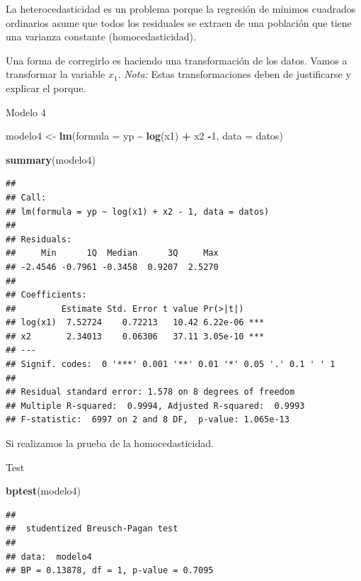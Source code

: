 \documentclass[
]{book}
\newenvironment{Shaded}{\begin{snugshade}}{\end{snugshade}}
\newcommand{\AttributeTok}[1]{\textcolor[rgb]{0.13,0.29,0.53}{#1}}
\newcommand{\DecValTok}[1]{\textcolor[rgb]{0.00,0.00,0.81}{#1}}
\newcommand{\FunctionTok}[1]{\textcolor[rgb]{0.13,0.29,0.53}{\textbf{#1}}}
\newcommand{\NormalTok}[1]{#1}
\newcommand{\OtherTok}[1]{\textcolor[rgb]{0.56,0.35,0.01}{#1}}
\newcommand{\SpecialCharTok}[1]{\textcolor[rgb]{0.81,0.36,0.00}{\textbf{#1}}}
\begin{document}
La heterocedasticidad es un problema porque la regresión de mínimos cuadrados ordinarios asume que todos los residuales se extraen de una población que tiene una varianza constante (homocedasticidad).

Una forma de corregirlo es haciendo una transformación de los datos. Vamos a transformar la variable \(x_1\).
\emph{Nota:} Estas transformaciones deben de justificarse y explicar el porque.

Modelo 4

\begin{Shaded}
\begin{Highlighting}[]
\NormalTok{modelo4 }\OtherTok{\textless{}{-}} \FunctionTok{lm}\NormalTok{(}\AttributeTok{formula =}\NormalTok{ yp }\SpecialCharTok{\textasciitilde{}} \FunctionTok{log}\NormalTok{(x1) }\SpecialCharTok{+}\NormalTok{ x2 }\SpecialCharTok{{-}}\DecValTok{1}\NormalTok{, }\AttributeTok{data =}\NormalTok{ datos)}

\FunctionTok{summary}\NormalTok{(modelo4)}
\end{Highlighting}
\end{Shaded}

\begin{verbatim}
## 
## Call:
## lm(formula = yp ~ log(x1) + x2 - 1, data = datos)
## 
## Residuals:
##     Min      1Q  Median      3Q     Max 
## -2.4546 -0.7961 -0.3458  0.9207  2.5270 
## 
## Coefficients:
##         Estimate Std. Error t value Pr(>|t|)    
## log(x1)  7.52724    0.72213   10.42 6.22e-06 ***
## x2       2.34013    0.06306   37.11 3.05e-10 ***
## ---
## Signif. codes:  0 '***' 0.001 '**' 0.01 '*' 0.05 '.' 0.1 ' ' 1
## 
## Residual standard error: 1.578 on 8 degrees of freedom
## Multiple R-squared:  0.9994, Adjusted R-squared:  0.9993 
## F-statistic:  6997 on 2 and 8 DF,  p-value: 1.065e-13
\end{verbatim}

Si realizamos la prueba de la homocedasticidad.

Test

\begin{Shaded}
\begin{Highlighting}[]
\FunctionTok{bptest}\NormalTok{(modelo4)}
\end{Highlighting}
\end{Shaded}

\begin{verbatim}
## 
##  studentized Breusch-Pagan test
## 
## data:  modelo4
## BP = 0.13878, df = 1, p-value = 0.7095
\end{verbatim}
\end{document}
